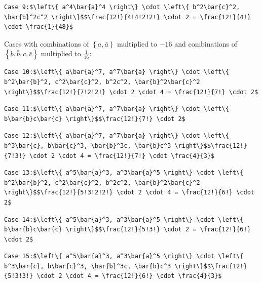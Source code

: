 \begin{enumerate}
\begin{verbatim}
Case 9:$\left\{ a^4\bar{a}^4 \right\} \cdot \left\{ b^2\bar{c}^2, \bar{b}^2c^2 \right\}$$\frac{12!}{4!4!2!2!} \cdot 2 = \frac{12!}{4!} \cdot \frac{1}{48}$ 
\end{verbatim}

Cases with combinations of $\left\{ a, \bar{a} \right\}$ multiplied to $-16$ and combinations of $\left\{ b, \bar{b}, c, \bar{c} \right\}$ multiplied to $\frac{1}{16}$:

 \begin{verbatim}
Case 10:$\left\{ a\bar{a}^7, a^7\bar{a} \right\} \cdot \left\{ b^2\bar{b}^2, c^2\bar{c}^2, b^2c^2, \bar{b}^2\bar{c}^2 \right\}$$\frac{12!}{7!2!2!} \cdot 2 \cdot 4 = \frac{12!}{7!} \cdot 2$
\end{verbatim}

\begin{verbatim}
Case 11:$\left\{ a\bar{a}^7, a^7\bar{a} \right\} \cdot \left\{ b\bar{b}c\bar{c} \right\}$$\frac{12!}{7!} \cdot 2$ 
\end{verbatim}

\begin{verbatim}
Case 12:$\left\{ a\bar{a}^7, a^7\bar{a} \right\} \cdot \left\{ b^3\bar{c}, b\bar{c}^3, \bar{b}^3c, \bar{b}c^3 \right\}$$\frac{12!}{7!3!} \cdot 2 \cdot 4 = \frac{12!}{7!} \cdot \frac{4}{3}$ 
\end{verbatim}

\begin{verbatim}
Case 13:$\left\{ a^5\bar{a}^3, a^3\bar{a}^5 \right\} \cdot \left\{ b^2\bar{b}^2, c^2\bar{c}^2, b^2c^2, \bar{b}^2\bar{c}^2 \right\}$$\frac{12!}{5!3!2!2!} \cdot 2 \cdot 4 = \frac{12!}{6!} \cdot 2$
\end{verbatim}

\begin{verbatim}
Case 14:$\left\{ a^5\bar{a}^3, a^3\bar{a}^5 \right\} \cdot \left\{ b\bar{b}c\bar{c} \right\}$$\frac{12!}{5!3!} \cdot 2 = \frac{12!}{6!} \cdot 2$ 
\end{verbatim}

\begin{verbatim}
Case 15:$\left\{ a^5\bar{a}^3, a^3\bar{a}^5 \right\} \cdot \left\{ b^3\bar{c}, b\bar{c}^3, \bar{b}^3c, \bar{b}c^3 \right\}$$\frac{12!}{5!3!3!} \cdot 2 \cdot 4 = \frac{12!}{6!} \cdot \frac{4}{3}$ 
\end{verbatim}


\end{enumerate}
